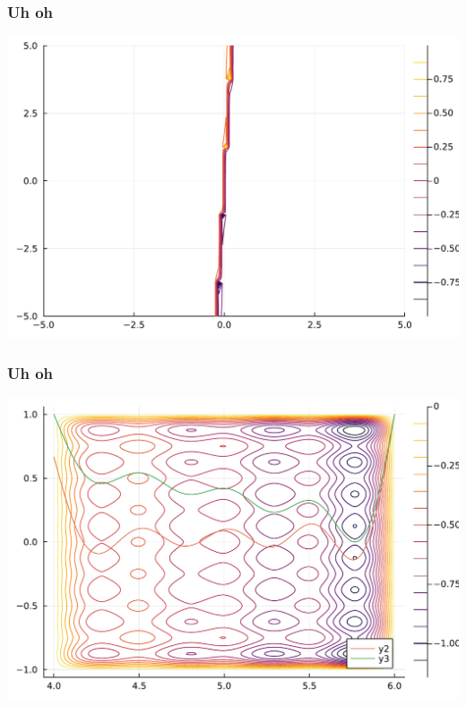\documentclass{beamer}
\begin{document}
\begin{frame}
\frametitle{Uh oh}

\centering
\includegraphics[scale=0.5]{imgs/what-1.pdf}

\end{frame}

\begin{frame}
\frametitle{Uh oh}

\centering
\includegraphics[scale=0.5]{imgs/what-2.pdf}

\end{frame}
\end{document}
